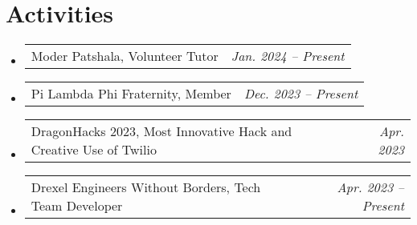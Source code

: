 \documentclass[letterpaper,11pt]{article}
\makeatletter
\newcommand{\resumeSubSubheading}[2]{
    \item
    \begin{tabular*}{0.97\textwidth}{l@{\extracolsep{\fill}}r}
      \small#1 & \textit{\small#2} \\
    \end{tabular*}\vspace{-7pt}
}
\newcommand{\resumeSubHeadingListStart}{\begin{itemize}[leftmargin=0.15in, label={}]}
\newcommand{\resumeSubHeadingListEnd}{\end{itemize}}
\makeatother
\begin{document}
\section{Activities}
\vspace{-5pt} %
\resumeSubHeadingListStart
    \resumeSubSubheading{Moder Patshala, Volunteer Tutor}{\textit{Jan. 2024 -- Present}}
    \resumeSubSubheading{Pi Lambda Phi Fraternity, Member}{\textit{Dec. 2023 -- Present}}
    \resumeSubSubheading{DragonHacks 2023, Most Innovative Hack and Creative Use of Twilio}{\textit{Apr. 2023}}
    \resumeSubSubheading{Drexel Engineers Without Borders, Tech Team Developer}{\textit{Apr. 2023 -- Present}}
\resumeSubHeadingListEnd



\end{document}
